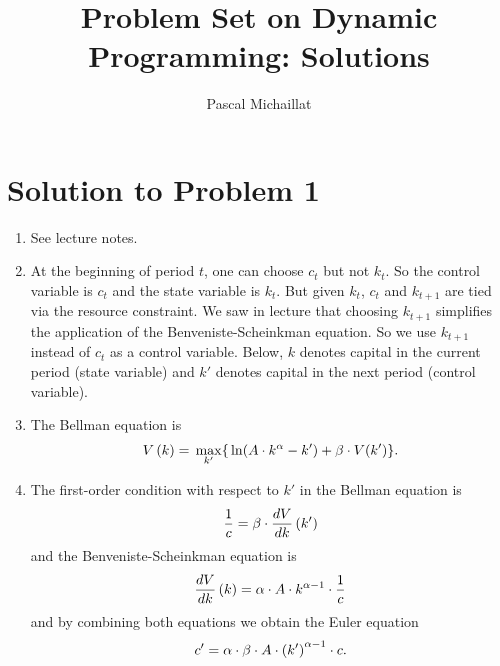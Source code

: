 \documentclass[letterpaper,12pt,leqno]{article}
\begin{document}
\title{Problem Set on Dynamic Programming: Solutions}
\author{Pascal Michaillat}
\date{}

\begin{titlepage}
\maketitle
\end{titlepage}

\section*{Solution to Problem 1}

\begin{enumerate}
\item See lecture notes.
\item At the beginning of period $t$, one can choose $c_{t}$ but not $k_{t}$. So the control variable is $c_{t}$ and the state variable is $k_{t}$. But given $k_{t}$, $c_{t}$ and $k_{t+1}$ are tied via the resource constraint. We saw in lecture that choosing $k_{t+1}$ simplifies the application of the Benveniste-Scheinkman equation. So we use $k_{t+1}$ instead of $c_{t}$ as a control variable.  Below, $k$ denotes capital in the current period (state variable) and $k'$ denotes capital in the next period (control variable).
\item The Bellman equation is 
\begin{align*}
V\bp{k} =\max[k']{\ln{A\cdot k^{\a}-k'} +\b\cdot V(k')}.
\end{align*}
\item The first-order condition with respect to $k'$ in the Bellman equation is
\begin{align}
\frac{1}{c} =\beta \cdot \frac{d V}{d k}\left( k' \right)\label{eq:EQ1}
\end{align}
and the Benveniste-Scheinkman equation is
\begin{align*}
\frac{d V}{d k}\left( k \right) =\alpha\cdot  A\cdot k^{\alpha -1}\cdot \frac{1}{c} 
\end{align*}
and by combining both equations we obtain the Euler equation
\begin{align*}
c' =\alpha \cdot \beta \cdot A\cdot \left( k' \right)^{\alpha -1}\cdot c .
\end{align*}


\end{enumerate}
\end{document}
